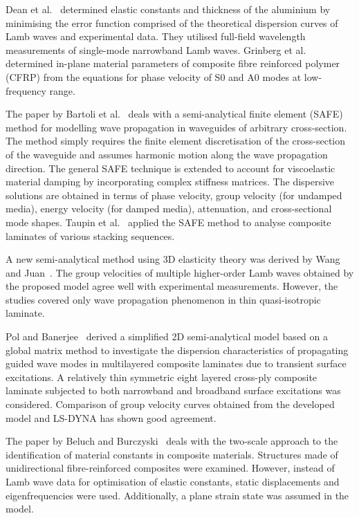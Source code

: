 	Dean et al.~\cite{Dean2008} determined elastic constants and thickness of the aluminium by minimising the error function comprised of the theoretical dispersion curves of Lamb waves and experimental data. They utilised full-field wavelength measurements of single-mode narrowband Lamb waves. Grinberg et al.~\cite{Grimberg2010} determined in-plane material parameters of composite fibre reinforced polymer (CFRP) from the equations for phase velocity of S0 and A0 modes at low-frequency range. 
	
	The paper by Bartoli et al.~\cite{Bartoli2006} deals with a semi-analytical finite element (SAFE) method for modelling wave propagation in waveguides of arbitrary cross-section. The method simply requires the finite element discretisation of the cross-section of the waveguide and assumes harmonic motion along the wave propagation direction. The general SAFE technique is extended to account for viscoelastic material damping by incorporating complex stiffness matrices. The dispersive solutions are obtained in terms of phase velocity, group velocity (for undamped media), energy velocity (for damped media), attenuation, and cross-sectional mode shapes. Taupin et al.~\cite{Taupin2011} applied the SAFE method to analyse composite laminates of various stacking sequences.
	
	A new semi-analytical method using 3D elasticity theory was derived by Wang and Juan~\cite{Wang2007}. The group velocities of multiple higher-order Lamb waves obtained by the proposed model agree well with experimental measurements. However, the studies covered only wave propagation phenomenon in thin quasi-isotropic laminate. 
	
	Pol and Banerjee~\cite{Pol2013} derived a simplified 2D semi-analytical model based on a global matrix method to investigate the dispersion characteristics of propagating guided wave modes in multilayered composite laminates due to transient surface excitations. A relatively thin symmetric eight layered cross-ply composite laminate subjected to both narrowband and broadband surface excitations was considered. Comparison of group velocity curves obtained from the developed model and LS-DYNA has shown good agreement.
	
	The paper by Beluch and Burczyski~\cite{Beluch2014} deals with the two-scale approach to the identification of material constants in composite materials. Structures made of unidirectional fibre-reinforced composites were examined. However, instead of Lamb wave data for optimisation of elastic constants, static displacements and eigenfrequencies were used. Additionally, a plane strain state was assumed in the model.
	

